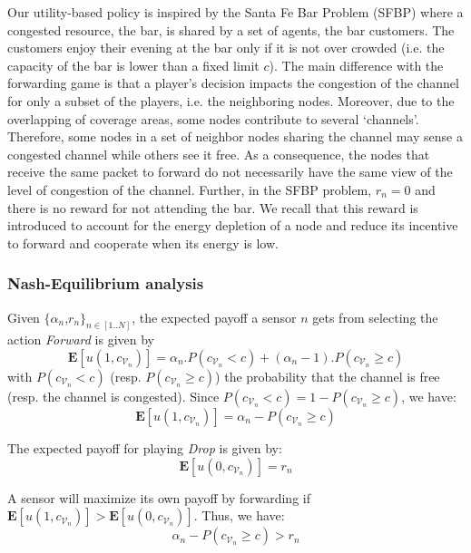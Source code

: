 \documentclass[journal, peerreview, onecolumn, draftcls]{IEEEtran}
\begin{document}
Our utility-based policy is inspired by the Santa Fe Bar Problem (SFBP)\cite{mishra} where a congested resource, the bar, is shared by a set of agents, the bar customers. The customers enjoy their evening at the bar only if it is not over crowded (i.e. the capacity of the bar is lower than a fixed limit $c$).
The main difference with the forwarding game is that a player's decision impacts the congestion of the channel for only a subset of the players, i.e. the neighboring nodes. Moreover, due to the overlapping of coverage areas, some nodes contribute to several `channels'. Therefore, some nodes in a set of neighbor nodes sharing the channel may sense a congested channel while others see it free. As a consequence, the nodes that receive the same packet to forward do not necessarily have the same view of the level of congestion of the channel. Further, in the SFBP problem, $r_n=0$ and there is no reward for not attending the bar. We recall that this reward is introduced to account for the energy depletion of a node and reduce its incentive to forward and cooperate when its energy is low.

\subsubsection{Nash-Equilibrium analysis}
Given $\{\alpha_n$,$r_n\}_{n\in [1..N]}$, the expected payoff a sensor $n$ gets from selecting the action {\it Forward} is given by
\begin{equation}
 \mathbf{E}[u(1, c_{\mathcal{V}_n})]=\alpha_n.P(c_{\mathcal{V}_n}<c) + (\alpha_n-1).P(c_{\mathcal{V}_n}\geq c)
\end{equation}
with $P(c_{\mathcal{V}_n}<c)$ (resp. $P(c_{\mathcal{V}_n}\geq c)$) the probability that the channel is free (resp. the channel is congested).
Since $P(c_{\mathcal{V}_n}<c) = 1-P(c_{\mathcal{V}_n}\geq c)$, we have:
\begin{equation}
 \mathbf{E}[u(1, c_{\mathcal{V}_n})]=\alpha_n-P(c_{\mathcal{V}_n}\geq c)
\end{equation}

The expected payoff for playing {\it Drop} is given by:
\begin{equation}
\mathbf{E}[u(0, c_{\mathcal{V}_n})]=r_n
\end{equation}

A sensor will maximize its own payoff by forwarding if $ \mathbf{E}[u(1, c_{\mathcal{V}_n})]> \mathbf{E}[u(0, c_{\mathcal{V}_n})]$. Thus, we have:
\begin{equation}
\alpha_n-P(c_{\mathcal{V}_n}\geq c)>r_n
\end{equation}
\end{document}
